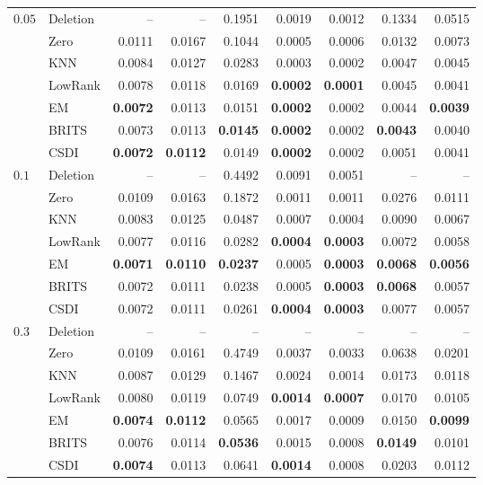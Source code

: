 \begin{table}[p]
\begin{tabular}{llrrrrrrr}
    \midrule
    $0.05$ & Deletion & -- & -- & 0.1951 & 0.0019 & 0.0012 & 0.1334 & 0.0515 \\
     & Zero & 0.0111 & 0.0167 & 0.1044 & 0.0005 & 0.0006 & 0.0132 & 0.0073 \\
     & KNN & 0.0084 & 0.0127 & 0.0283 & 0.0003 & 0.0002 & 0.0047 & 0.0045 \\
     & LowRank & 0.0078 & 0.0118 & 0.0169 & \textbf{0.0002} & \textbf{0.0001} & 0.0045 & 0.0041 \\
     & EM & \textbf{0.0072} & 0.0113 & 0.0151 & \textbf{0.0002} & 0.0002 & 0.0044 & \textbf{0.0039} \\
     & BRITS & 0.0073 & 0.0113 & \textbf{0.0145} & \textbf{0.0002} & 0.0002 & \textbf{0.0043} & 0.0040 \\
     & CSDI & \textbf{0.0072} & \textbf{0.0112} & 0.0149 & \textbf{0.0002} & 0.0002 & 0.0051 & 0.0041 \\
    \midrule
    $0.1$ & Deletion & -- & -- & 0.4492 & 0.0091 & 0.0051 & -- & -- \\
     & Zero & 0.0109 & 0.0163 & 0.1872 & 0.0011 & 0.0011 & 0.0276 & 0.0111 \\
     & KNN & 0.0083 & 0.0125 & 0.0487 & 0.0007 & 0.0004 & 0.0090 & 0.0067 \\
     & LowRank & 0.0077 & 0.0116 & 0.0282 & \textbf{0.0004} & \textbf{0.0003} & 0.0072 & 0.0058 \\
     & EM & \textbf{0.0071} & \textbf{0.0110} & \textbf{0.0237} & 0.0005 & \textbf{0.0003} & \textbf{0.0068} & \textbf{0.0056} \\
     & BRITS & 0.0072 & 0.0111 & 0.0238 & 0.0005 & \textbf{0.0003} & \textbf{0.0068} & 0.0057 \\
     & CSDI & 0.0072 & 0.0111 & 0.0261 & \textbf{0.0004} & \textbf{0.0003} & 0.0077 & 0.0057 \\
    \midrule
    $0.3$ & Deletion & -- & -- & -- & -- & -- & -- & -- \\
     & Zero & 0.0109 & 0.0161 & 0.4749 & 0.0037 & 0.0033 & 0.0638 & 0.0201 \\
     & KNN & 0.0087 & 0.0129 & 0.1467 & 0.0024 & 0.0014 & 0.0173 & 0.0118 \\
     & LowRank & 0.0080 & 0.0119 & 0.0749 & \textbf{0.0014} & \textbf{0.0007} & 0.0170 & 0.0105 \\
     & EM & \textbf{0.0074} & \textbf{0.0112} & 0.0565 & 0.0017 & 0.0009 & 0.0150 & \textbf{0.0099} \\
     & BRITS & 0.0076 & 0.0114 & \textbf{0.0536} & 0.0015 & 0.0008 & \textbf{0.0149} & 0.0101 \\
     & CSDI & \textbf{0.0074} & 0.0113 & 0.0641 & \textbf{0.0014} & 0.0008 & 0.0203 & 0.0112 \\
    \bottomrule
  \end{tabular}
\end{table}

